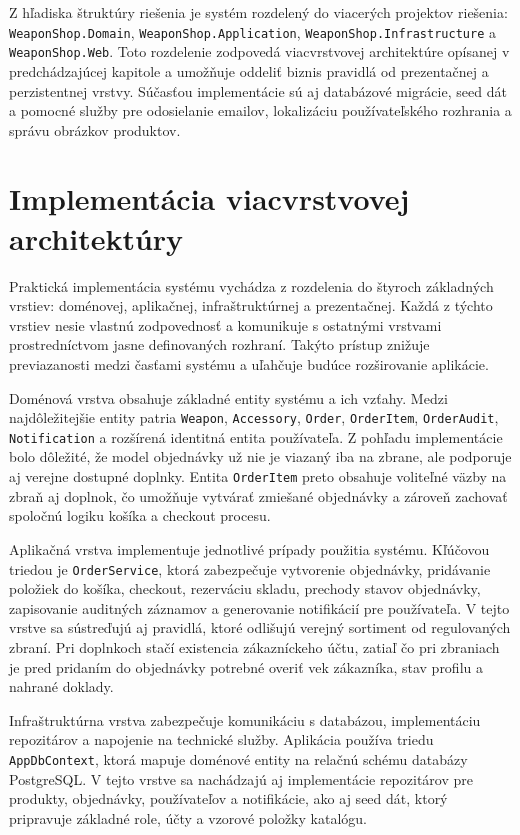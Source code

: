 Z hľadiska štruktúry riešenia je systém rozdelený do viacerých projektov riešenia: \texttt{WeaponShop.Domain}, \texttt{WeaponShop.Application}, \texttt{WeaponShop.Infrastructure} a \texttt{WeaponShop.Web}. Toto rozdelenie zodpovedá viacvrstvovej architektúre opísanej v predchádzajúcej kapitole a umožňuje oddeliť biznis pravidlá od prezentačnej a perzistentnej vrstvy. Súčasťou implementácie sú aj databázové migrácie, seed dát a pomocné služby pre odosielanie emailov, lokalizáciu používateľského rozhrania a správu obrázkov produktov.

\section{Implementácia viacvrstvovej architektúry}
\label{sec:implementation-layered-architecture}

Praktická implementácia systému vychádza z rozdelenia do štyroch základných vrstiev: doménovej, aplikačnej, infraštruktúrnej a prezentačnej. Každá z týchto vrstiev nesie vlastnú zodpovednosť a komunikuje s ostatnými vrstvami prostredníctvom jasne definovaných rozhraní. Takýto prístup znižuje previazanosti medzi časťami systému a uľahčuje budúce rozširovanie aplikácie.

Doménová vrstva obsahuje základné entity systému a ich vzťahy. Medzi najdôležitejšie entity patria \texttt{Weapon}, \texttt{Accessory}, \texttt{Order}, \texttt{OrderItem}, \texttt{OrderAudit}, \texttt{Notification} a rozšírená identitná entita používateľa. Z pohľadu implementácie bolo dôležité, že model objednávky už nie je viazaný iba na zbrane, ale podporuje aj verejne dostupné doplnky. Entita \texttt{OrderItem} preto obsahuje voliteľné väzby na zbraň aj doplnok, čo umožňuje vytvárať zmiešané objednávky a zároveň zachovať spoločnú logiku košíka a checkout procesu.

Aplikačná vrstva implementuje jednotlivé prípady použitia systému. Kľúčovou triedou je \texttt{OrderService}, ktorá zabezpečuje vytvorenie objednávky, pridávanie položiek do košíka, checkout, rezerváciu skladu, prechody stavov objednávky, zapisovanie auditných záznamov a generovanie notifikácií pre používateľa. V tejto vrstve sa sústreďujú aj pravidlá, ktoré odlišujú verejný sortiment od regulovaných zbraní. Pri doplnkoch stačí existencia zákazníckeho účtu, zatiaľ čo pri zbraniach je pred pridaním do objednávky potrebné overiť vek zákazníka, stav profilu a nahrané doklady.

Infraštruktúrna vrstva zabezpečuje komunikáciu s databázou, implementáciu repozitárov a napojenie na technické služby. Aplikácia používa triedu \texttt{AppDbContext}, ktorá mapuje doménové entity na relačnú schému databázy PostgreSQL. V tejto vrstve sa nachádzajú aj implementácie repozitárov pre produkty, objednávky, používateľov a notifikácie, ako aj seed dát, ktorý pripravuje základné role, účty a vzorové položky katalógu.

